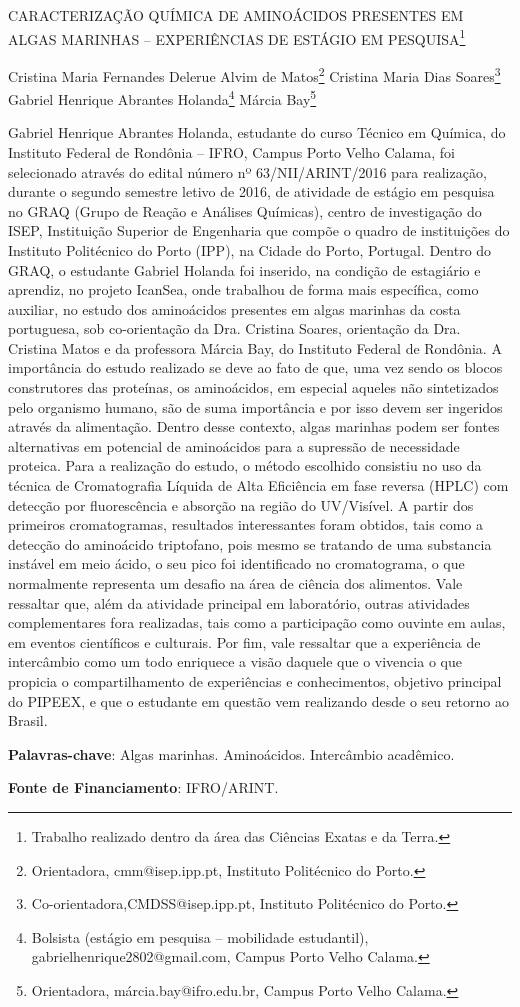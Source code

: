 \documentclass[article,12pt,onesidea,4paper,english,brazil]{abntex2}
\begin{document}
	
	
	\frenchspacing 
	
	\begin{center}
		\LARGE CARACTERIZAÇÃO QUÍMICA DE AMINOÁCIDOS PRESENTES EM ALGAS
		MARINHAS -- EXPERIÊNCIAS DE ESTÁGIO EM PESQUISA\footnote{Trabalho realizado dentro da área das Ciências Exatas e da Terra.}
		
		\normalsize
	Cristina Maria Fernandes Delerue Alvim de Matos\footnote{Orientadora, cmm@isep.ipp.pt, Instituto Politécnico do Porto.} 
	Cristina Maria Dias Soares\footnote{Co-orientadora,CMDSS@isep.ipp.pt, Instituto Politécnico do Porto.} 
	Gabriel Henrique Abrantes Holanda\footnote{Bolsista (estágio em pesquisa – mobilidade estudantil), gabrielhenrique2802@gmail.com, Campus
		Porto Velho Calama.} 
	Márcia Bay\footnote{Orientadora, márcia.bay@ifro.edu.br, Campus Porto Velho Calama.} 
	\end{center}
	
	\noindent Gabriel Henrique Abrantes Holanda, estudante do curso Técnico em Química, do
	Instituto Federal de Rondônia – IFRO, Campus Porto Velho Calama, foi selecionado
	através do edital número nº 63/NII/ARINT/2016 para realização, durante o segundo
	semestre letivo de 2016, de atividade de estágio em pesquisa no GRAQ (Grupo de
	Reação e Análises Químicas), centro de investigação do ISEP, Instituição Superior
	de Engenharia que compõe o quadro de instituições do Instituto Politécnico do Porto
	(IPP), na Cidade do Porto, Portugal. Dentro do GRAQ, o estudante Gabriel Holanda
	foi inserido, na condição de estagiário e aprendiz, no projeto IcanSea, onde
	trabalhou de forma mais específica, como auxiliar, no estudo dos aminoácidos
	presentes em algas marinhas da costa portuguesa, sob co-orientação da Dra.
	Cristina Soares, orientação da Dra. Cristina Matos e da professora Márcia Bay, do
	Instituto Federal de Rondônia. A importância do estudo realizado se deve ao fato de
	que, uma vez sendo os blocos construtores das proteínas, os aminoácidos, em
	especial aqueles não sintetizados pelo organismo humano, são de suma importância
	e por isso devem ser ingeridos através da alimentação. Dentro desse contexto,
	algas marinhas podem ser fontes alternativas em potencial de aminoácidos para a
	supressão de necessidade proteica. Para a realização do estudo, o método
	escolhido consistiu no uso da técnica de Cromatografia Líquida de Alta Eficiência em
	fase reversa (HPLC) com detecção por fluorescência e absorção na região do
	UV/Visível. A partir dos primeiros cromatogramas, resultados interessantes foram
	obtidos, tais como a detecção do aminoácido triptofano, pois mesmo se tratando de
	uma substancia instável em meio ácido, o seu pico foi identificado no cromatograma,
	o que normalmente representa um desafio na área de ciência dos alimentos. Vale
	ressaltar que, além da atividade principal em laboratório, outras atividades
	complementares fora realizadas, tais como a participação como ouvinte em aulas,
	em eventos científicos e culturais. Por fim, vale ressaltar que a experiência de
	intercâmbio como um todo enriquece a visão daquele que o vivencia o que propicia
	o compartilhamento de experiências e conhecimentos, objetivo principal do PIPEEX,
	e que o estudante em questão vem realizando desde o seu retorno ao Brasil.
	
	\vspace{\onelineskip}
	
	\noindent
	\textbf{Palavras-chave}: Algas marinhas. Aminoácidos. Intercâmbio acadêmico.

		 \noindent
	\textbf{Fonte de Financiamento}: IFRO/ARINT.
\end{document}
